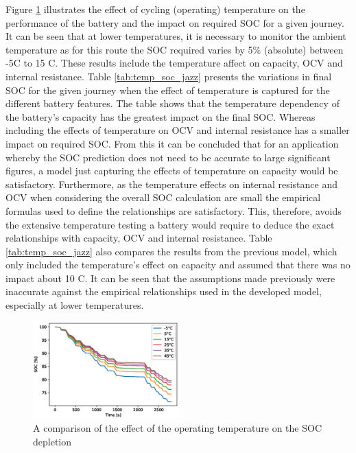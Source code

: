 \documentclass[a4paper, 10pt]{article}
\numberwithin{equation}{section}
\begin{document}
Figure \ref{fig:eval_op_temp} illustrates the effect of cycling (operating) temperature on the performance of the battery and the impact on required SOC for a given journey. It can be seen that at lower temperatures, it is necessary to monitor the ambient temperature as for this route the SOC required varies by 5\% (absolute) between -5\degree C to 15 \degree C. These results include the temperature affect on capacity, OCV and internal resistance. Table \ref{tab:temp_soc_jazz} presents the variations in final SOC for the given journey when the effect of temperature is captured for the different battery features. The table shows that the temperature dependency of the battery's capacity has the greatest impact on the final SOC. Whereas including the effects of temperature on OCV and internal resistance has a smaller impact on required SOC. From this it can be concluded that for an application whereby the SOC prediction does not need to be accurate to large significant figures, a model just capturing the effects of temperature on capacity would be satisfactory. Furthermore, as the temperature effects on internal resistance and OCV when considering the overall SOC calculation are small the empirical formulas used to define the relationships are satisfactory. This, therefore, avoids the extensive temperature testing a battery would require to deduce the exact relationships with capacity, OCV and internal resistance. Table \ref{tab:temp_soc_jazz} also compares the results from the previous model, which only included the temperature's effect on capacity and assumed that there was no impact about 10 \degree C. It can be seen that the assumptions made previously were inaccurate against the empirical relationships used in the developed model, especially at lower temperatures.


\begin{figure}[H]
    \centering
    \includegraphics[width=0.5\textwidth]{images/eval_op_temp.eps}
    \caption{A comparison of the effect of the operating temperature on the SOC depletion}
    \label{fig:eval_op_temp}
\end{figure}
\end{document}
